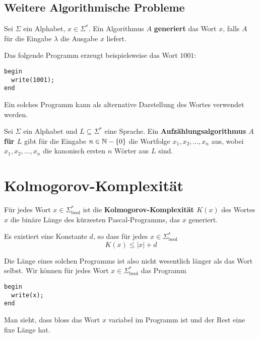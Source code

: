 \subsection{Weitere Algorithmische Probleme}
\begin{definition}
Sei $\Sigma$ ein Alphabet, $x \in \Sigma^*$. Ein Algorithmus $A$ \textbf{generiert} das Wort $x$, falls $A$ für die Eingabe $\lambda$ die Ausgabe $x$ liefert.\\
\end{definition}

Das folgende Programm erzeugt beispielsweise das Wort $1001$:
\begin{lstlisting}
begin
  write(1001);
end
\end{lstlisting}

Ein solches Programm kann als alternative Darstellung des Wortes verwendet werden.\\

\begin{definition}
Sei $\Sigma$ ein Alphabet und $L \subseteq \Sigma^*$ eine Sprache. Ein \textbf{Aufzählungsalgorithmus $A$ für $L$} gibt für die Eingabe $n \in \mathbb{N} - \{0\}$ die Wortfolge $x_1, x_2, \ldots, x_n$ aus, wobei $x_1, x_2, \ldots, x_n$ die kanonisch ersten $n$ Wörter aus $L$ sind.
\end{definition}

\section{Kolmogorov-Komplexität}
\begin{definition}
Für jedes Wort $x \in \Sigma_\text{bool}^*$ ist die \textbf{Kolmogorov-Komplexität $K(x)$} des Wortes $x$ die binäre Länge des kürzesten Pascal-Programms, das $x$ generiert.
\end{definition}

\begin{lemma}
Es existiert eine Konstante $d$, so dass für jedes $x \in \Sigma_\text{bool}^*$
\[
K(x) \leq |x| + d
\]
\end{lemma}

Die Länge eines solchen Programms ist also nicht wesentlich länger als das Wort selbst. Wir können für jedes Wort $x \in \Sigma_\text{bool}^*$ das Programm
\begin{lstlisting}
begin
  write(x);
end
\end{lstlisting}

Man sieht, dass bloss das Wort $x$ variabel im Programm ist und der Rest eine fixe Länge hat.

